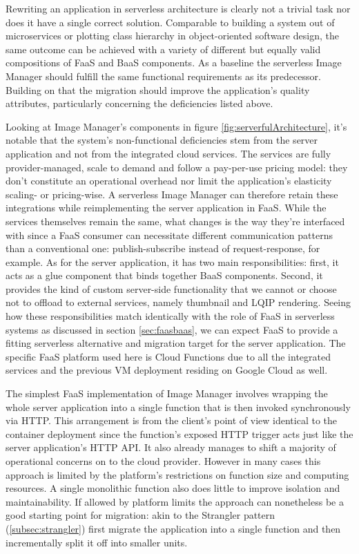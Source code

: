 Rewriting an application in serverless architecture is clearly not a trivial task nor does it have a single correct solution. Comparable to building a system out of microservices or plotting class hierarchy in object-oriented software design, the same outcome can be achieved with a variety of different but equally valid compositions of FaaS and BaaS components. As a baseline the serverless Image Manager should fulfill the same functional requirements as its predecessor. Building on that the migration should improve the application's quality attributes, particularly concerning the deficiencies listed above.

Looking at Image Manager's components in figure \ref{fig:serverfulArchitecture}, it's notable that the system's non-functional deficiencies stem from the server application and not from the integrated cloud services. The services are fully provider-managed, scale to demand and follow a pay-per-use pricing model: they don't constitute an operational overhead nor limit the application's elasticity scaling- or pricing-wise. A serverless Image Manager can therefore retain these integrations while reimplementing the server application in FaaS. While the services themselves remain the same, what changes is the way they're interfaced with since a FaaS consumer can necessitate different communication patterns than a conventional one: publish-subscribe instead of request-response, for example. As for the server application, it has two main responsibilities: first, it acts as a glue component that binds together BaaS components. Second, it provides the kind of custom server-side functionality that we cannot or choose not to offload to external services, namely thumbnail and LQIP rendering. Seeing how these responsibilities match identically with the role of FaaS in serverless systems as discussed in section \ref{sec:faasbaas}, we can expect FaaS to provide a fitting serverless alternative and migration target for the server application. The specific FaaS platform used here is Cloud Functions \parencite{google18cloudFunctions} due to all the integrated services and the previous VM deployment residing on Google Cloud as well.

The simplest FaaS implementation of Image Manager involves wrapping the whole server application into a single function that is then invoked synchronously via HTTP. This arrangement is from the client's point of view identical to the container deployment since the function's exposed HTTP trigger acts just like the server application's HTTP API. It also already manages to shift a majority of operational concerns on to the cloud provider. However in many cases this approach is limited by the platform's restrictions on function size and computing resources. A single monolithic function also does little to improve isolation and maintainability. If allowed by platform limits the approach can nonetheless be a good starting point for migration: akin to the Strangler pattern (\ref{subsec:strangler}) first migrate the application into a single function and then incrementally split it off into smaller units.

